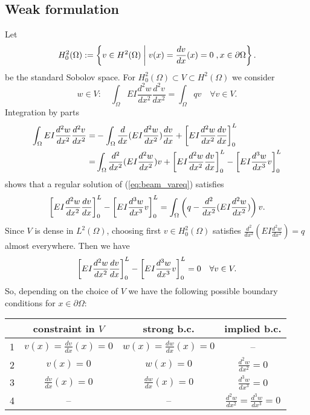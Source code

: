 \subsection{Weak formulation}\label{subsec:}
%
Let
%
\begin{equation}\label{eq:beam_V}
H^2_0(\Omega):= \left\{v\in H^2(\Omega)\;\middle|\;v(x)=\frac{d v}{dx}(x)=0\;,x\in\partial\Omega\right\}.
\end{equation}
%
be the standard Sobolov space.  
%
For $H^2_0(\Omega) \subset V\subset H^2(\Omega)$ we consider
%
\begin{equation}\label{eq:beam_vareq}
w\in V:\quad \int_{\Omega} EI \frac{d^2 w}{dx^2}\frac{d^2 v}{dx^2}= \int_{\Omega} qv \quad \forall v\in V.
\end{equation}
%
Integration by parts
%
\begin{align*}
\int_{\Omega} EI \frac{d^2 w}{dx^2}\frac{d^2 v}{dx^2}=&-\int_{\Omega}  \frac{d}{dx}(EI \frac{d^2 w}{dx^2})\frac{d v}{dx} + \left[{EI\frac{d^2 w}{dx^2}\frac{d v}{dx}}\right]_{0}^{L}\\
=& \int_{\Omega} \frac{d^2}{dx^2}(EI \frac{d^2 w}{dx^2})v + \left[{EI\frac{d^2 w}{dx^2}\frac{d v}{dx}}\right]_{0}^{L}- \left[{EI\frac{d^3 w}{dx^3}v}\right]_{0}^{L}
\end{align*}
%
shows that a regular solution of (\ref{eq:beam_vareq}) satisfies
%
\begin{align*}
\left[{EI\frac{d^2 w}{dx^2}\frac{d v}{dx}}\right]_{0}^{L}- \left[{EI\frac{d^3 w}{dx^3}v}\right]_{0}^{L} = 
\int_{\Omega} \left( q - \frac{d^2}{dx^2}(EI \frac{d^2 w}{dx^2})\right)v.
\end{align*}
%
Since $V$ is dense in $L^2(\Omega)$, choosing first $v\in H^2_0(\Omega)$ satisfies $\frac{d^2}{dx^2}(EI \frac{d^2 w}{dx^2})=q$ almost everywhere. Then we have
%
\begin{align*}
\left[{EI\frac{d^2 w}{dx^2}\frac{d v}{dx}}\right]_{0}^{L}- \left[{EI\frac{d^3 w}{dx^3}v}\right]_{0}^{L} = 0\quad \forall v\in V.
\end{align*}
%
So, depending on the choice of $V$ we have the following possible boundary conditions for $x\in\partial\Omega$:
\begin{center}
\begin{tabular}{c|c|c|c}
&constraint in $V$& strong b.c. & implied b.c.\\\hline
1&$v(x)=\frac{dv}{dx}(x)=0$ & $w(x)=\frac{d w}{dx}(x)=0$ & --\\
2&$v(x)=0$ & $w(x)=0$ & $\frac{d^2 w}{dx^2}=0$\\
3&$\frac{dv}{dx}(x)=0$ & $\frac{dw}{dx}(x)=0$ & $\frac{d^3 w}{dx^3}=0$\\
4&-- & -- & $\frac{d^2 w}{dx^2}=\frac{d^3 w}{dx^3}=0$
\end{tabular}
\end{center}
